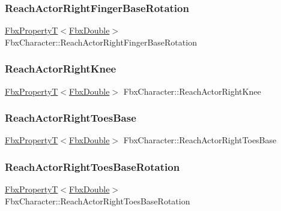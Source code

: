 \subsubsection{\texorpdfstring{Reach\+Actor\+Right\+Finger\+Base\+Rotation}{ReachActorRightFingerBaseRotation}}
{\footnotesize\ttfamily \hyperlink{class_fbx_property_t}{Fbx\+PropertyT}$<$\hyperlink{fbxtypes_8h_a171e72a1c46fc15c1a6c9c31948c1c5b}{Fbx\+Double}$>$ Fbx\+Character\+::\+Reach\+Actor\+Right\+Finger\+Base\+Rotation}

\mbox{\label{class_fbx_character_a6d6fa21a105a213580ce1e578a6ae1b0}} 
\subsubsection{\texorpdfstring{Reach\+Actor\+Right\+Knee}{ReachActorRightKnee}}
{\footnotesize\ttfamily \hyperlink{class_fbx_property_t}{Fbx\+PropertyT}$<$\hyperlink{fbxtypes_8h_a171e72a1c46fc15c1a6c9c31948c1c5b}{Fbx\+Double}$>$ Fbx\+Character\+::\+Reach\+Actor\+Right\+Knee}

\mbox{\label{class_fbx_character_a837e3aeaad970205dea5a25bd4382c21}} 
\subsubsection{\texorpdfstring{Reach\+Actor\+Right\+Toes\+Base}{ReachActorRightToesBase}}
{\footnotesize\ttfamily \hyperlink{class_fbx_property_t}{Fbx\+PropertyT}$<$\hyperlink{fbxtypes_8h_a171e72a1c46fc15c1a6c9c31948c1c5b}{Fbx\+Double}$>$ Fbx\+Character\+::\+Reach\+Actor\+Right\+Toes\+Base}

\mbox{\label{class_fbx_character_a04b250a928d03e2047b49640e07e051a}} 
\subsubsection{\texorpdfstring{Reach\+Actor\+Right\+Toes\+Base\+Rotation}{ReachActorRightToesBaseRotation}}
{\footnotesize\ttfamily \hyperlink{class_fbx_property_t}{Fbx\+PropertyT}$<$\hyperlink{fbxtypes_8h_a171e72a1c46fc15c1a6c9c31948c1c5b}{Fbx\+Double}$>$ Fbx\+Character\+::\+Reach\+Actor\+Right\+Toes\+Base\+Rotation}

